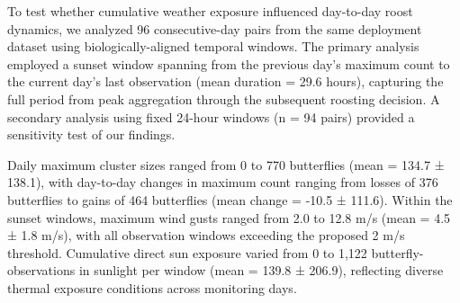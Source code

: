 To test whether cumulative weather exposure influenced day-to-day roost dynamics, we analyzed 96 consecutive-day pairs from the same deployment dataset using biologically-aligned temporal windows. The primary analysis employed a sunset window spanning from the previous day's maximum count to the current day's last observation (mean duration = 29.6 hours), capturing the full period from peak aggregation through the subsequent roosting decision. A secondary analysis using fixed 24-hour windows (n = 94 pairs) provided a sensitivity test of our findings.

Daily maximum cluster sizes ranged from 0 to 770 butterflies (mean = 134.7 ± 138.1), with day-to-day changes in maximum count ranging from losses of 376 butterflies to gains of 464 butterflies (mean change = -10.5 ± 111.6). Within the sunset windows, maximum wind gusts ranged from 2.0 to 12.8 m/s (mean = 4.5 ± 1.8 m/s), with all observation windows exceeding the proposed 2 m/s threshold. Cumulative direct sun exposure varied from 0 to 1,122 butterfly-observations in sunlight per window (mean = 139.8 ± 206.9), reflecting diverse thermal exposure conditions across monitoring days.